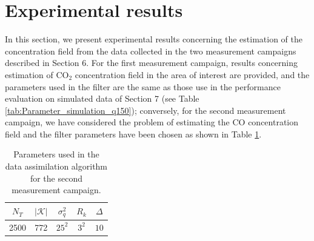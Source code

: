 \documentclass[journal]{IEEEtran}
\begin{document}
\section{Experimental results}
In this section, we present experimental results concerning the estimation of the concentration field from the data collected in the two measurement campaigns described in Section 6.
For the first measurement campaign, results concerning estimation of CO$_2$ concentration field in the area of interest are provided, and the parameters used in the filter are the same as those use
in the performance evaluation on simulated data of Section 7  (see Table \ref{tab:Parameter_simulation_q150}); conversely, for the second measurement campaign, we have considered the problem of
estimating the CO concentration field and the filter parameters have been chosen as shown in Table \ref{tab:Parameter_simulation_scm_2}.
\begin{table}[tbp]
 \centering
 \begin{center}  
  \begin{tabular}{|c|c|c|c|c|}
\hline
  $N_T$ & $|\mathcal{K}|$ & $\sigma_{q}^{2}$ & $R_k$ & $\Delta$\\  \hline
 2500 & 772 & $25^2$ & $3^2$ & $10$ \\
\hline
  \end{tabular}
\end{center}  
\caption{Parameters used in the data assimilation algorithm for the second measurement campaign.}
  \label{tab:Parameter_simulation_scm_2}
\end{table}
\end{document}
